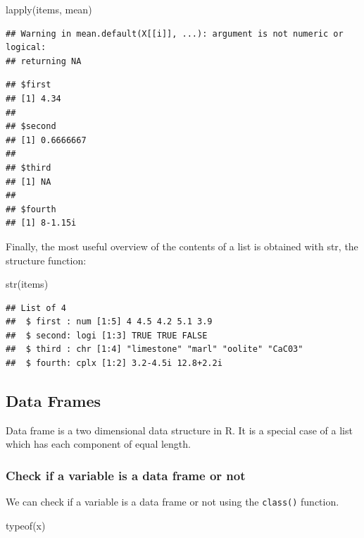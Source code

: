 \documentclass[
]{book}
\newenvironment{Shaded}{\begin{snugshade}}{\end{snugshade}}
\newcommand{\FunctionTok}[1]{\textcolor[rgb]{0.00,0.00,0.00}{#1}}
\newcommand{\NormalTok}[1]{#1}
\begin{document}
\begin{Shaded}
\begin{Highlighting}[]
\FunctionTok{lapply}\NormalTok{(items, mean)}
\end{Highlighting}
\end{Shaded}

\begin{verbatim}
## Warning in mean.default(X[[i]], ...): argument is not numeric or logical:
## returning NA
\end{verbatim}

\begin{verbatim}
## $first
## [1] 4.34
## 
## $second
## [1] 0.6666667
## 
## $third
## [1] NA
## 
## $fourth
## [1] 8-1.15i
\end{verbatim}

Finally, the most useful overview of the contents of a list is obtained with str, the structure function:

\begin{Shaded}
\begin{Highlighting}[]
\FunctionTok{str}\NormalTok{(items)}
\end{Highlighting}
\end{Shaded}

\begin{verbatim}
## List of 4
##  $ first : num [1:5] 4 4.5 4.2 5.1 3.9
##  $ second: logi [1:3] TRUE TRUE FALSE
##  $ third : chr [1:4] "limestone" "marl" "oolite" "CaC03"
##  $ fourth: cplx [1:2] 3.2-4.5i 12.8+2.2i
\end{verbatim}

\hypertarget{data-frames}{%
\subsection{Data Frames}\label{data-frames}}

Data frame is a two dimensional data structure in R. It is a special case of a list which has each component of equal length.

\hypertarget{check-if-a-variable-is-a-data-frame-or-not}{%
\subsubsection{Check if a variable is a data frame or not}\label{check-if-a-variable-is-a-data-frame-or-not}}

We can check if a variable is a data frame or not using the \texttt{class()} function.

\begin{Shaded}
\begin{Highlighting}[]
\FunctionTok{typeof}\NormalTok{(x)}
\end{Highlighting}
\end{Shaded}
\end{document}

